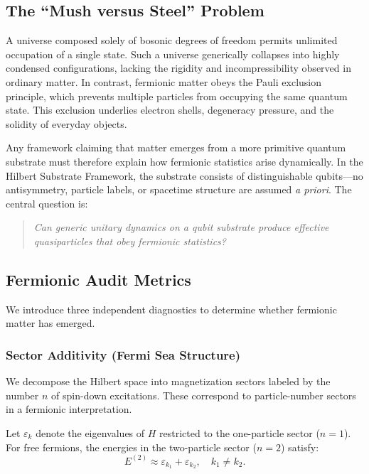 \documentclass[11pt]{article}
\begin{document}
\subsection{The ``Mush versus Steel'' Problem}

A universe composed solely of bosonic degrees of freedom permits unlimited occupation of a single state. Such a universe generically collapses into highly condensed configurations, lacking the rigidity and incompressibility observed in ordinary matter. In contrast, fermionic matter obeys the Pauli exclusion principle, which prevents multiple particles from occupying the same quantum state. This exclusion underlies electron shells, degeneracy pressure, and the solidity of everyday objects.

Any framework claiming that matter emerges from a more primitive quantum substrate must therefore explain how fermionic statistics arise dynamically. In the Hilbert Substrate Framework, the substrate consists of distinguishable qubits---no antisymmetry, particle labels, or spacetime structure are assumed \emph{a priori}. The central question is:

\begin{quote}
\emph{Can generic unitary dynamics on a qubit substrate produce effective quasiparticles that obey fermionic statistics?}
\end{quote}

\subsection{Fermionic Audit Metrics}

We introduce three independent diagnostics to determine whether fermionic matter has emerged.

\subsubsection{Sector Additivity (Fermi Sea Structure)}

We decompose the Hilbert space into magnetization sectors labeled by the number $n$ of spin-down excitations. These correspond to particle-number sectors in a fermionic interpretation.

Let $\varepsilon_k$ denote the eigenvalues of $H$ restricted to the one-particle sector ($n=1$). For free fermions, the energies in the two-particle sector ($n=2$) satisfy:
\begin{equation}
E^{(2)} \approx \varepsilon_{k_1} + \varepsilon_{k_2}, \quad k_1 \neq k_2.
\end{equation}
\end{document}
